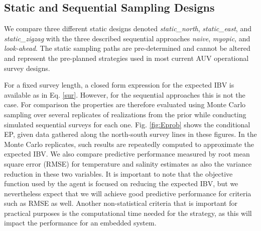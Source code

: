 \documentclass[aoas]{imsart}
\begin{document}
\subsection{Static and Sequential Sampling Designs}\label{sec:sampling_designs}


We compare three different static designs denoted
\textit{static\_north}, \textit{static\_east}, and
\textit{static\_zigzag} with the three described sequential approaches
\textit{naive}, \textit{myopic}, and \textit{look-ahead}. The static sampling paths are pre-determined and cannot be altered and represent the pre-planned strategies used in most current AUV
operational survey designs.

For a fixed survey length, a closed form expression for the expected IBV is available as in Eq. \eqref{sur}. However, for the sequential approaches this is not the
case. For comparison the properties are therefore evaluated using
Monte Carlo sampling over several replicates of realizations from the
prior while conducting simulated sequential surveys for each
one. Fig. \ref{fig:Eprob} shows the conditional EP, given data
gathered along the north-south survey lines in these figures. In the
Monte Carlo replicates, such results are repeatedly computed to
approximate the expected IBV. We also compare predictive performance
measured by root mean square error (RMSE) for temperature and salinity
estimates as also the variance reduction in these two variables. It is
important to note that the objective function used by the agent is
focused on reducing the expected IBV, but we nevertheless expect that
we will achieve good predictive performance for criteria such as RMSE
as well. Another non-statistical criteria that is important for
practical purposes is the computational time needed for the strategy,
as this will impact the performance for an embedded system.
\end{document}
